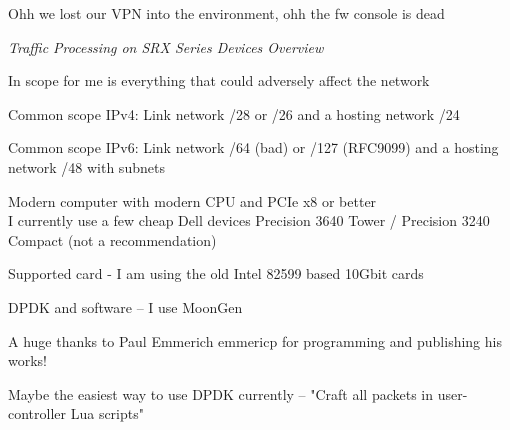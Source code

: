 \documentclass[Screen16to9,17pt]{foils}
\begin{document}
\vskip 1cm
\centerline{Ohh we lost our VPN into the environment, ohh the fw console is dead}



\emph{Traffic Processing on SRX Series Devices Overview}\\ {\scriptsize
{}}







\begin{list2}
\item In scope for me is everything that could adversely affect the network
\item Common scope IPv4: Link network /28 or /26 and a hosting network /24
\item Common scope IPv6: Link network /64 (bad) or /127 (RFC9099) and a hosting network /48 with subnets
\end{list2}





\begin{list2}
\item Modern computer with modern CPU and PCIe x8 or better\\
I currently use a few cheap Dell devices Precision 3640 Tower / Precision 3240 Compact (not a recommendation)
\item Supported card - I am using the old Intel 82599 based 10Gbit cards
\item DPDK and software -- I use MoonGen 
\item A huge thanks to Paul Emmerich emmericp for programming and publishing his works!
\item Maybe the easiest way to use DPDK currently -- "Craft all packets in user-controller Lua scripts"
\end{list2}
\end{document}

